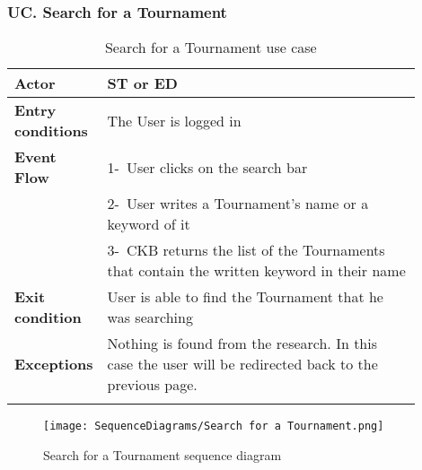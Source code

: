 \subsubsection*{UC\cuc . Search for a Tournament}
\begin{center}
    \begin{longtable}{|l|p{0.9\linewidth}|}
        \hline
        \textbf{Actor}            & ST or ED                                                                                                                                                                                       \\
        \hline
        \textbf{Entry conditions} & The User is logged in  \\
        \hline
        \textbf{Event Flow}       & 1-\ User clicks on the search bar        \\
        & 2-\ User writes a Tournament's name or a keyword of it \\
        & 3-\ CKB returns the list of the Tournaments that contain the written keyword in their name         \\
        \hline
        \textbf{Exit condition}   & User is able to find the Tournament that he was searching        \\
        \hline
        \textbf{Exceptions}        & Nothing is found from the research. In this case the user will be redirected back to the previous page.\\%
        \hline
        \caption{Search for a Tournament use case}
        \label{tab: search_for_a_Tournament_use_case}
    \end{longtable}
\end{center}

\begin{figure}[H]
    \begin{center}
        \texttt{[image: SequenceDiagrams/Search for a Tournament.png]}
        \caption{Search for a Tournament sequence diagram}
        \label{fig:search_for_a_Tournament_seqd}%
    \end{center}
\end{figure}

